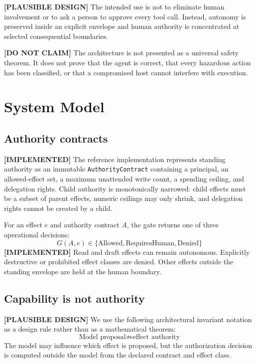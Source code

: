 \documentclass[10pt,twocolumn]{article}
\newcommand{\implemented}{\textbf{[IMPLEMENTED] }}
\newcommand{\plausibledesign}{\textbf{[PLAUSIBLE DESIGN] }}
\newcommand{\donotclaim}{\textbf{[DO NOT CLAIM] }}
\begin{document}
\plausibledesign The intended use is not to eliminate human involvement or to ask a person to approve every tool call. Instead, autonomy is preserved inside an explicit envelope and human authority is concentrated at selected consequential boundaries.

\donotclaim The architecture is not presented as a universal safety theorem. It does not prove that the agent is correct, that every hazardous action has been classified, or that a compromised host cannot interfere with execution.

\section{System Model}

\subsection{Authority contracts}
\implemented The reference implementation represents standing authority as an immutable \texttt{AuthorityContract} containing a principal, an allowed-effect set, a maximum unattended write count, a spending ceiling, and delegation rights. Child authority is monotonically narrowed: child effects must be a subset of parent effects, numeric ceilings may only shrink, and delegation rights cannot be created by a child.

For an effect $e$ and authority contract $A$, the gate returns one of three operational decisions:
\begin{equation}
G(A, e) \in \{\text{Allowed}, \text{RequiresHuman}, \text{Denied}\}
\end{equation}
\implemented Read and draft effects can remain autonomous. Explicitly destructive or prohibited effect classes are denied. Other effects outside the standing envelope are held at the human boundary.

\subsection{Capability is not authority}
\plausibledesign We use the following architectural invariant notation as a design rule rather than as a mathematical theorem:
\begin{equation}
\text{Model proposal} \not\Longrightarrow \text{effect authority}
\end{equation}
The model may influence which effect is proposed, but the authorization decision is computed outside the model from the declared contract and effect class.
\end{document}
